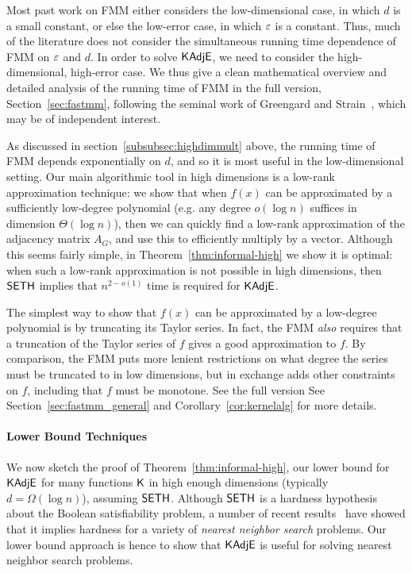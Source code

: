 Most past work on FMM either considers the low-dimensional case, in which $d$ is a small constant, or else the low-error case, in which $\varepsilon$ is a constant. Thus, much of the literature does not consider the simultaneous running time dependence of FMM on $\varepsilon$ and $d$. In order to solve $\mathsf{KAdjE}$, we need to consider the high-dimensional, high-error case. We thus give a clean mathematical overview and detailed analysis of the running time of FMM in 
\ifdefined\isfocs
the full version,
\else Section~\ref{sec:fastmm},
\fi
following the seminal work of Greengard and Strain~\cite{gs91}, which may be of independent interest.  

As discussed in section~\ref{subsubsec:highdimmult} above, the running time of FMM depends exponentially on $d$, and so it is most useful in the low-dimensional setting. Our main algorithmic tool in high dimensions is a low-rank approximation technique: we show that when $f(x)$ can be approximated by a sufficiently low-degree polynomial (e.g. any degree $o(\log n)$ suffices in dimension $\Theta(\log n)$), then we can quickly find a low-rank approximation of the adjacency matrix $A_G$, and use this to efficiently multiply by a vector. Although this seems fairly simple, in Theorem~\ref{thm:informal-high} we show it is optimal: when such a low-rank approximation is not possible in high dimensions, then $\mathsf{SETH}$ implies that $n^{2 - o(1)}$ time is required for $\mathsf{KAdjE}$.

The simplest way to show that $f(x)$ can be approximated by a low-degree polynomial is by truncating its Taylor series. In fact, the FMM \emph{also} requires that a truncation of the Taylor series of $f$ gives a good approximation to $f$. By comparison, the FMM puts more lenient restrictions on what degree the series must be truncated to in low dimensions, but in exchange adds other constraints on $f$, including that $f$ must be monotone. \ifdefined\isfocs
See the full version 
\else
See Section~\ref{sec:fastmm_general} and Corollary~\ref{cor:kernelalg} 
\fi 
for more details.


\paragraph*{Lower Bound Techniques}

We now sketch the proof of Theorem~\ref{thm:informal-high}, our lower bound for $\mathsf{KAdjE}$ for many functions $\mathsf{K}$ in high enough dimensions (typically $d = \Omega(\log n)$), assuming $\mathsf{SETH}$. Although $\mathsf{SETH}$ is a hardness hypothesis about the Boolean satisfiability problem, a number of recent results~\cite{aw15,r18,c18,sm19} have showed that it implies hardness for a variety of \emph{nearest neighbor search} problems. Our lower bound approach is hence to show that $\mathsf{KAdjE}$ is useful for solving nearest neighbor search problems.


